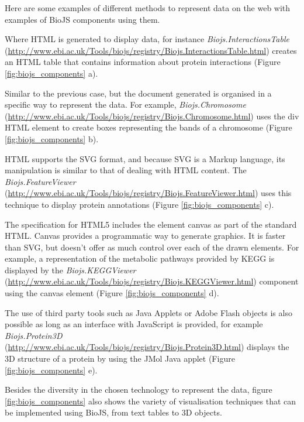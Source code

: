 Here are some examples of different methods to represent data on the web with examples of BioJS components using them.
\begin{description}
\setlength\itemsep{-0.3em}
\item[HTML documents] Where HTML is generated to display data, for instance \emph{Biojs.InteractionsTable} (\url{http://www.ebi.ac.uk/Tools/biojs/registry/Biojs.InteractionsTable.html}) creates an HTML table that contains information about protein interactions (Figure \ref{fig:biojs_components} a).
\item[Visualizations using HTML elements] Similar to the previous case, but the document generated is organised in a specific way to represent the data. For example,  \emph{Biojs.Chromosome} (\url{http://www.ebi.ac.uk/Tools/biojs/registry/Biojs.Chromosome.html}) uses the div HTML element to create boxes representing the bands of a chromosome (Figure \ref{fig:biojs_components} b).
\item[Scalable Vector Graphics] HTML supports the SVG format, and because SVG is a Markup language, its manipulation is similar to that of dealing with HTML content. The \emph{Biojs.FeatureViewer} (\url{http://www.ebi.ac.uk/Tools/biojs/registry/Biojs.FeatureViewer.html}) uses this technique to display protein annotations (Figure \ref{fig:biojs_components} c).
\item[HTML canvas] The specification for HTML5 includes the element canvas as part of the standard HTML. Canvas provides a programmatic way to generate graphics. It is faster than SVG, but doesn't offer as much control over each of the drawn elements. For example, a representation of the metabolic pathways provided by KEGG is displayed by the \emph{Biojs.KEGGViewer} (\url{http://www.ebi.ac.uk/Tools/biojs/registry/Biojs.KEGGViewer.html}) component using the canvas element (Figure \ref{fig:biojs_components} d).
\item[Browser plugins] The use of third party tools such as Java Applets or Adobe Flash objects is also possible as long as an interface with JavaScript is provided, for example \emph{Biojs.Protein3D} (\url{http://www.ebi.ac.uk/Tools/biojs/registry/Biojs.Protein3D.html}) displays the 3D structure of a protein by using the JMol Java applet (Figure \ref{fig:biojs_components} e).
\end{description}

Besides the diversity in the chosen technology to represent the data, figure \ref{fig:biojs_components} also shows the variety of visualisation techniques that can be implemented using BioJS, from text tables to 3D objects.


